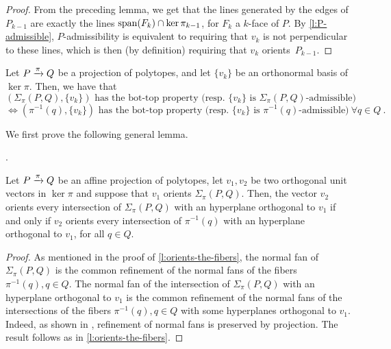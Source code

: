 \begin{proof}
	From the preceding lemma, we get that the lines generated by the edges of $P_{k-1}$ are exactly the lines $\operatorname{\mathrm{span}}(F_k)\cap \ker \pi_{k-1}$, for $F_k$ a $k$-face of $P$.
	By \cref{l:P-admissible}, $P$-admissibility is equivalent to requiring that $v_k$ is not perpendicular to these lines, which is then (by definition) requiring that $v_k$ orients~$P_{k-1}$.
\end{proof}


\begin{theorem}	\label{t:bot-top-for-fibers}
	Let $P \xrightarrow{\pi} Q$ be a projection of polytopes, and let $\{v_k\}$ be an orthonormal basis of $\ker \pi$.
	Then, we have that
	\[
	(\Sigma_\pi(P,Q),\{v_k\}) \text{ has the bot-top property (resp. } \{v_k\} \text{ is }\Sigma_\pi(P,Q)\text{-admissible)}
	\]
	\[
	\iff (\pi^{-1}(q),\{v_k\}) \text{ has the bot-top property (resp. } \{v_k\} \text{ is }\pi^{-1}(q)\text{-admissible)} \ \forall q \in Q \ .
	\]
\end{theorem}

We first prove the following general lemma.

.

\begin{lemma} \label{l:iterated-orientation}
	Let $P\xrightarrow{\pi} Q$ be an affine projection of polytopes, let $v_1, v_2$ be two orthogonal unit vectors in $\ker \pi$ and suppose that $v_1$ orients $\Sigma_\pi (P,Q)$.
	Then, the vector $v_2$ orients every intersection of $\Sigma_\pi (P,Q)$ with an hyperplane orthogonal to $v_1$ if and only if $v_2$ orients every intersection of $\pi^{-1}(q)$ with an hyperplane orthogonal to $v_1$, for all $q \in Q$.
\end{lemma}

\begin{proof}
	As mentioned in the proof of \cref{l:orients-the-fibers}, the normal fan of $\Sigma_\pi(P,Q)$ is the common refinement of the normal fans of the fibers $\pi^{-1}(q), q \in Q$.
	The normal fan of the intersection of $\Sigma_\pi(P,Q)$ with an hyperplane orthogonal to $v_1$ is the common refinement of the normal fans of the intersections of the fibers $\pi^{-1}(q), q \in Q$ with some hyperplanes orthogonal to $v_1$.
	Indeed, as shown in \cite[Lemma 3.1]{BilleraSturmfels94}, refinement of normal fans is preserved by projection.
	The result follows as in \cref{l:orients-the-fibers}.
\end{proof}

